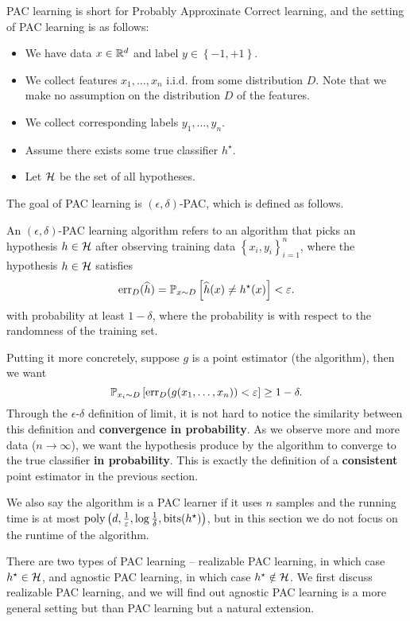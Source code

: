 \documentclass[a4paper]{article}
\begin{document}
PAC learning is short for Probably Approxinate Correct
learning, and the setting of PAC learning is as follows:
\begin{itemize}
  \item We have data $x \in \mathbb{R}^d$ and label $y \in \left\{ -1,
  +1 \right\}$.
  \item We collect features $x_1, \dots, x_n$ i.i.d. from
  some distribution $D$. Note that we make no assumption on
  the distribution $D$ of the features.
  \item We collect corresponding labels $y_1, \dots, y_n$.
  \item Assume there exists some true classifier $h^\star$.
  \item Let $\mathcal{H}$ be the set of all hypotheses.
\end{itemize}
The goal of PAC learning is $(\epsilon, \delta)$-PAC,
which is defined as follows.
\begin{defi}
  An $(\epsilon, \delta)$-PAC learning algorithm
  refers to an algorithm that
  picks an hypothesis $h \in \mathcal{H}$
  after observing training data
  $\left\{ x_i, y_i \right\}_{i=1}^n$,
  where the hypothesis $h \in \mathcal{H}$ satisfies
  \[
  \operatorname{err}_D (\widehat{h}) =
  \mathbb{P}_{x \sim D} \left[ \widehat{h}(x) \neq h^\star(x) \right]
  < \varepsilon.
  \]
  with probability at least $1 - \delta$, where the probability
  is with respect to the randomness of the training set.
\end{defi}
Putting it more concretely, suppose $g$ is a point estimator
(the algorithm), then we want
\[
\mathbb{P}_{x_i \sim D} \left[ \operatorname{err}_D (g(x_1, \dots, x_n)) < \varepsilon
\right] \geq 1 - \delta.
\]
Through the $\epsilon$-$\delta$ definition of limit,
it is not hard to
notice the similarity between this definition
and \textbf{convergence in probability}.
As we observe more and more data ($n \to \infty$),
we want the hypothesis
produce by the algorithm to converge to the true classifier
\textbf{in probability}. This is exactly the definition
of a \textbf{consistent} point estimator in the previous
section.

We also say the algorithm is a PAC learner if it uses
$n$ samples and the running time is at most $\operatorname{poly}
\left( d, \frac{1}{\varepsilon}, \log \frac{1}{\delta},
\operatorname{bits}(h^\star) \right)$, but in this section we do not
focus on the runtime of the algorithm.

There are two types of PAC learning -- realizable PAC learning,
in which case $h^\star \in \mathcal{H}$, and agnostic PAC learning,
in which case $h^\star \notin \mathcal{H}$. We first discuss
realizable PAC learning, and we will find out agnostic PAC
learning is a more general setting but than PAC learning
but a natural extension.
\end{document}
